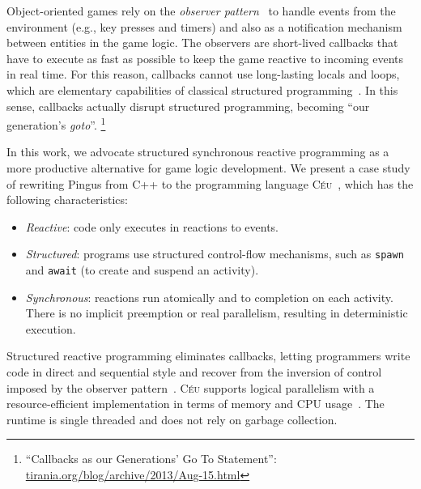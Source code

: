 \documentclass{vgtc}                          %
\newcommand{\CEU}{\textsc{C\'{e}u}\xspace}
\newcommand{\code}[1] {{\small{\texttt{#1}}}}
\begin{document}

Object-oriented games rely on the \emph{observer pattern}~\cite{games.patterns}
to handle events from the environment (e.g., key presses and timers) and also
as a notification mechanism between entities in the game logic.
%
The observers are short-lived callbacks that have to execute as fast as
possible to keep the game reactive to incoming events in real time.
%
For this reason, callbacks cannot use long-lasting locals and loops, which are
elementary capabilities of classical structured
programming~\cite{rp.deprecating,rp.rescala,sync_async.cooperative}.
%
In this sense, callbacks actually disrupt structured programming, becoming
``our generation's \emph{goto}''.%
\footnote{``Callbacks as our Generations' Go To Statement'':
\url{tirania.org/blog/archive/2013/Aug-15.html}}

In this work, we advocate structured synchronous reactive programming as a more
productive alternative for game logic development.
We present a case study of rewriting Pingus from C++ to the programming
language \CEU~\cite{ceu.sensys13,ceu.mod15}, which has the following
characteristics:
%
\begin{itemize}
\item \emph{Reactive}: code only executes in reactions to events.
\item \emph{Structured}: programs use structured control-flow mechanisms, such
      as \code{spawn} and \code{await} (to create and suspend an activity).
\item \emph{Synchronous}: reactions run atomically and to completion on each
      activity.
      There is no implicit preemption or real parallelism, resulting in
      deterministic execution.
\end{itemize}
%
Structured reactive programming eliminates callbacks, letting programmers write
code in direct and sequential style and recover from the inversion of control
imposed by the observer pattern~\cite{rp.deprecating}.
%
%
\CEU supports logical parallelism with a resource-efficient implementation in
terms of memory and CPU usage~\cite{ceu.sensys13}.
The runtime is single threaded and does not rely on garbage collection.
\end{document}
